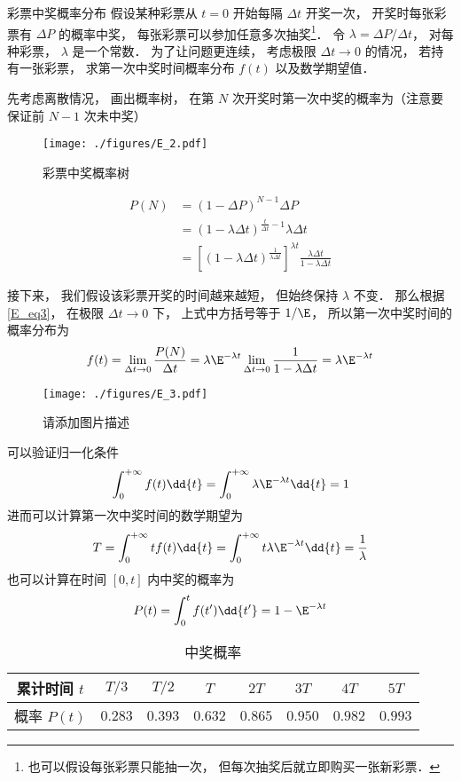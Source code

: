 \begin{example}{彩票中奖概率分布}
假设某种彩票从 $t = 0$ 开始每隔 $\Delta t$ 开奖一次， 开奖时每张彩票有 $\Delta P$ 的概率中奖， 每张彩票可以参加任意多次抽奖\footnote{也可以假设每张彩票只能抽一次， 但每次抽奖后就立即购买一张新彩票．}． 令 $\lambda = {\Delta P}/{\Delta t}$， 对每种彩票， $\lambda$ 是一个常数． 为了让问题更连续， 考虑极限 $\Delta t\to 0$ 的情况， 若持有一张彩票， 求第一次中奖时间概率分布 $f(t)$ 以及数学期望值．

先考虑离散情况， 画出概率树， 在第 $N$ 次开奖时第一次中奖的概率为（注意要保证前 $N-1$ 次未中奖）
\begin{figure}[ht]
\centering
\texttt{[image: ./figures/E\_2.pdf]}
\caption{彩票中奖概率树} \label{E_fig2}
\end{figure}
\begin{equation}
\begin{aligned}
P(N) &= (1-\Delta P)^{N-1} \Delta P\\
&= (1-\lambda\Delta t)^{\frac{t}{\Delta t}-1} \lambda\Delta t\\
&= [(1-\lambda\Delta t)^{\frac{1}{\lambda\Delta t}}]^{\lambda t} \frac{\lambda\Delta t}{1-\lambda\Delta t}
\end{aligned}
\end{equation}

接下来， 我们假设该彩票开奖的时间越来越短， 但始终保持 $\lambda$ 不变． 那么根据\autoref{E_eq3}， 在极限 $\Delta t\to 0$ 下， 上式中方括号等于 $1/\E$， 所以第一次中奖时间的概率分布为
\begin{equation}
f(t) = \lim_{\Delta t\to 0} \frac{P(N)}{\Delta t} = \lambda\E^{-\lambda t}\lim_{\Delta t\to 0} \frac{1}{1-\lambda\Delta t} = \lambda\E^{-\lambda t}
\end{equation}
\begin{figure}[ht]
\centering
\texttt{[image: ./figures/E\_3.pdf]}
\caption{请添加图片描述} \label{E_fig3}
\end{figure}
可以验证归一化条件
\begin{equation}
\int_0^{+\infty} f(t) \dd{t} = \int_0^{+\infty} \lambda\E^{-\lambda t} \dd{t} = 1
\end{equation}
进而可以计算第一次中奖时间的数学期望为
\begin{equation}
T = \int_0^{+\infty} t f(t) \dd{t} = \int_0^{+\infty}t \lambda\E^{-\lambda t} \dd{t} = \frac{1}{\lambda}
\end{equation}
也可以计算在时间 $[0, t]$ 内中奖的概率为
\begin{equation}
P(t) = \int_0^{t} f(t') \dd{t'} = 1 - \E^{-\lambda t}
\end{equation}
\begin{table}[ht]
\centering
\caption{中奖概率}\label{E_tab2}
\begin{tabular}{|c|c|c|c|c|c|c|c|}
\hline
累计时间 $t$ & $T/3$  & $T/2$  & $T$     & $2T$ &     $3T$   &  $4T$   & $5T$\\
\hline
概率 $P(t)$ & $0.283$ & $0.393$ & $0.632$ & $0.865$ & $0.950$ & $0.982$ & $0.993$\\
\hline
\end{tabular}
\end{table}
\end{example}
